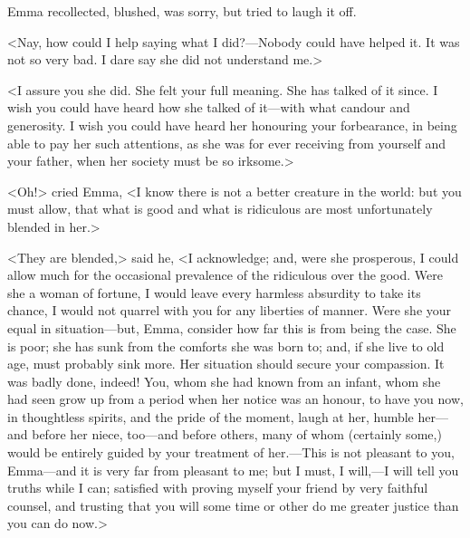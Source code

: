 Emma recollected, blushed, was sorry, but tried to laugh it off.

<Nay, how could I help saying what I did?—Nobody could have helped it. It was not so very bad. I dare say she did not understand me.>

<I assure you she did. She felt your full meaning. She has talked of it since. I wish you could have heard how she talked of it—with what candour and generosity. I wish you could have heard her honouring your forbearance, in being able to pay her such attentions, as she was for ever receiving from yourself and your father, when her society must be so irksome.>

<Oh!> cried Emma, <I know there is not a better creature in the world: but you must allow, that what is good and what is ridiculous are most unfortunately blended in her.>

<They are blended,> said he, <I acknowledge; and, were she prosperous, I could allow much for the occasional prevalence of the ridiculous over the good. Were she a woman of fortune, I would leave every harmless absurdity to take its chance, I would not quarrel with you for any liberties of manner. Were she your equal in situation—but, Emma, consider how far this is from being the case. She is poor; she has sunk from the comforts she was born to; and, if she live to old age, must probably sink more. Her situation should secure your compassion. It was badly done, indeed! You, whom she had known from an infant, whom she had seen grow up from a period when her notice was an honour, to have you now, in thoughtless spirits, and the pride of the moment, laugh at her, humble her—and before her niece, too—and before others, many of whom (certainly some,) would be entirely guided by your treatment of her.—This is not pleasant to you, Emma—and it is very far from pleasant to me; but I must, I will,—I will tell you truths while I can; satisfied with proving myself your friend by very faithful counsel, and trusting that you will some time or other do me greater justice than you can do now.>

